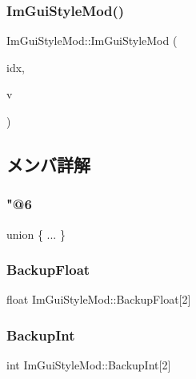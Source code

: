 \subsubsection{\texorpdfstring{Im\+Gui\+Style\+Mod()}{ImGuiStyleMod()}\hspace{0.1cm}{\footnotesize\ttfamily [3/3]}}
{\footnotesize\ttfamily Im\+Gui\+Style\+Mod\+::\+Im\+Gui\+Style\+Mod (\begin{DoxyParamCaption}\item[{\mbox{\hyperlink{imgui_8h_ac919acabce24faae590e295b424874ca}{Im\+Gui\+Style\+Var}}}]{idx,  }\item[{\mbox{\hyperlink{struct_im_vec2}{Im\+Vec2}}}]{v }\end{DoxyParamCaption})\hspace{0.3cm}{\ttfamily [inline]}}



\subsection{メンバ詳解}
\mbox{\label{struct_im_gui_style_mod_a4307f70f6364de07cba9fee7523fe2b6}} 
\subsubsection{\texorpdfstring{"@6}{@6}}
{\footnotesize\ttfamily union \{ ... \} }

\mbox{\label{struct_im_gui_style_mod_af36b5cf1100de970d78a53db937be949}} 
\subsubsection{\texorpdfstring{Backup\+Float}{BackupFloat}}
{\footnotesize\ttfamily float Im\+Gui\+Style\+Mod\+::\+Backup\+Float\mbox{[}2\mbox{]}}

\mbox{\label{struct_im_gui_style_mod_a60491c95989b2a866ebb76403a562f6f}} 
\subsubsection{\texorpdfstring{Backup\+Int}{BackupInt}}
{\footnotesize\ttfamily int Im\+Gui\+Style\+Mod\+::\+Backup\+Int\mbox{[}2\mbox{]}}

